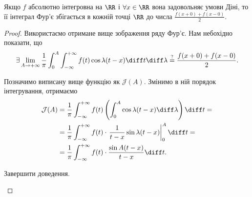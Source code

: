 \begin{proposition}
    Якщо $f$ абсолютно інтегровна на $\RR$ і $\forall x \in \RR$ вона задовольняє умови Діні, то її інтеграл Фур'є збігається в кожній точці $\RR$ до числа $\frac{f(x + 0) + f(x - 0)}{2}$.
\end{proposition}
\begin{proof}
    Використаємо отримане вище зображення ряду Фур'є. Нам небохідно показати, що
    \begin{equation}
        \exists \lim_{A \to + \infty} \frac{1}{\pi} \int_0^A \int_{-\infty}^{+\infty} f(t) \cos \lambda (t - x) \diff t \diff \lambda \overset{?}{=} \frac{f(x + 0) + f(x - 0)}{2}.
    \end{equation}

    Позначимо виписану вище функцію як $\mathcal{J}(A)$. Змінимо в ній порядок інтегрування, отримаємо
    \begin{equation}
        \begin{aligned}
            \mathcal{J}(A)
            &=\frac{1}{\pi} \int_{-\infty}^{+\infty} f(t) \left( \int_0^A \cos \lambda (t - x) \diff \lambda \right) \diff t = \\
            &= \frac{1}{\pi} \int_{-\infty}^{+\infty} f(t) \cdot \left. \frac{1}{t - x} \sin \lambda (t - x) \right|_0^A \diff t = \\
            &= \frac{1}{\pi} \int_{-\infty}^{+\infty} f(t) \cdot \frac{\sin A (t - x)}{t - x} \diff t.
        \end{aligned}
    \end{equation}
    \begin{exercise}
        Завершити доведення.
    \end{exercise}
\end{proof}
